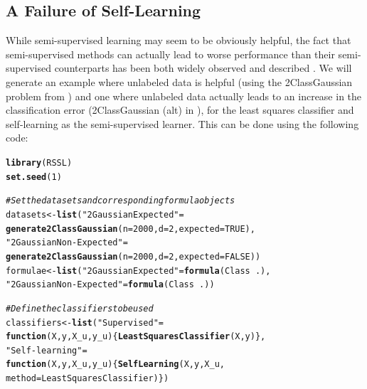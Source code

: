 \documentclass[runningheads,a4paper]{llncs}\usepackage[]{graphicx}\usepackage[]{color}
\makeatletter
\newcommand{\hlnum}[1]{\textcolor[rgb]{0.686,0.059,0.569}{#1}}%
\newcommand{\hlstr}[1]{\textcolor[rgb]{0.192,0.494,0.8}{#1}}%
\newcommand{\hlcom}[1]{\textcolor[rgb]{0.678,0.584,0.686}{\textit{#1}}}%
\newcommand{\hlopt}[1]{\textcolor[rgb]{0,0,0}{#1}}%
\newcommand{\hlstd}[1]{\textcolor[rgb]{0.345,0.345,0.345}{#1}}%
\newcommand{\hlkwa}[1]{\textcolor[rgb]{0.161,0.373,0.58}{\textbf{#1}}}%
\newcommand{\hlkwb}[1]{\textcolor[rgb]{0.69,0.353,0.396}{#1}}%
\newcommand{\hlkwc}[1]{\textcolor[rgb]{0.333,0.667,0.333}{#1}}%
\newcommand{\hlkwd}[1]{\textcolor[rgb]{0.737,0.353,0.396}{\textbf{#1}}}%
\newenvironment{kframe}{%
 \def\at@end@of@kframe{}%
 \ifinner\ifhmode%
  \def\at@end@of@kframe{\end{minipage}}%
  \begin{minipage}{\columnwidth}%
 \fi\fi%
 \def\FrameCommand##1{\hskip\@totalleftmargin \hskip-\fboxsep
 \colorbox{shadecolor}{##1}\hskip-\fboxsep
     \hskip-\linewidth \hskip-\@totalleftmargin \hskip\columnwidth}%
 \MakeFramed {\advance\hsize-\width
   \@totalleftmargin\z@ \linewidth\hsize
   \@setminipage}}%
 {\par\unskip\endMakeFramed%
 \at@end@of@kframe}
\newenvironment{knitrout}{}{} %
\makeatother
\begin{document}
\subsection{A Failure of Self-Learning}
While semi-supervised learning may seem to be obviously helpful, the fact that semi-supervised methods can actually lead to worse performance than their semi-supervised counterparts has been both widely observed and described \cite{Cozman2003}. We will generate an example where unlabeled data is helpful (using the 2ClassGaussian problem from ) and one where unlabeled data actually leads to an increase in the classification error (2ClassGaussian (alt) in ), for the least squares classifier and self-learning as the semi-supervised learner. This can be done using the following code:
\begin{knitrout}\footnotesize
{}\color{fgcolor}\begin{kframe}
\begin{alltt}
\hlkwd{library}\hlstd{(RSSL)}
\hlkwd{set.seed}\hlstd{(}\hlnum{1}\hlstd{)}

\hlcom{# Set the datasets and corresponding formula objects}
\hlstd{datasets} \hlkwb{<-} \hlkwd{list}\hlstd{(}\hlstr{"2 Gaussian Expected"}\hlstd{=}
                   \hlkwd{generate2ClassGaussian}\hlstd{(}\hlkwc{n}\hlstd{=}\hlnum{2000}\hlstd{,}\hlkwc{d}\hlstd{=}\hlnum{2}\hlstd{,}\hlkwc{expected}\hlstd{=}\hlnum{TRUE}\hlstd{),}
                 \hlstr{"2 Gaussian Non-Expected"}\hlstd{=}
                   \hlkwd{generate2ClassGaussian}\hlstd{(}\hlkwc{n}\hlstd{=}\hlnum{2000}\hlstd{,}\hlkwc{d}\hlstd{=}\hlnum{2}\hlstd{,}\hlkwc{expected}\hlstd{=}\hlnum{FALSE}\hlstd{))}
\hlstd{formulae} \hlkwb{<-} \hlkwd{list}\hlstd{(}\hlstr{"2 Gaussian Expected"}\hlstd{=}\hlkwd{formula}\hlstd{(Class}\hlopt{~}\hlstd{.),}
                 \hlstr{"2 Gaussian Non-Expected"}\hlstd{=}\hlkwd{formula}\hlstd{(Class}\hlopt{~}\hlstd{.))}

\hlcom{# Define the classifiers to be used}
\hlstd{classifiers} \hlkwb{<-} \hlkwd{list}\hlstd{(}\hlstr{"Supervised"} \hlstd{=}
                      \hlkwa{function}\hlstd{(}\hlkwc{X}\hlstd{,}\hlkwc{y}\hlstd{,}\hlkwc{X_u}\hlstd{,}\hlkwc{y_u}\hlstd{) \{} \hlkwd{LeastSquaresClassifier}\hlstd{(X,y)\},}
                    \hlstr{"Self-learning"} \hlstd{=}
                      \hlkwa{function}\hlstd{(}\hlkwc{X}\hlstd{,}\hlkwc{y}\hlstd{,}\hlkwc{X_u}\hlstd{,}\hlkwc{y_u}\hlstd{) \{} \hlkwd{SelfLearning}\hlstd{(X,y,X_u,}
                                                \hlkwc{method} \hlstd{= LeastSquaresClassifier)\})}


\end{alltt}
\end{kframe}
\end{knitrout}
\end{document}

